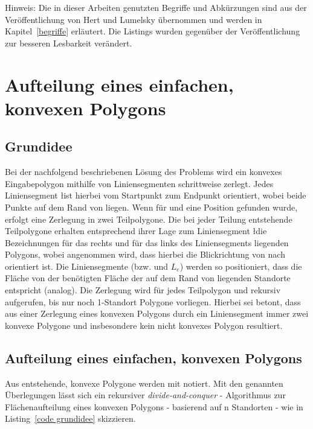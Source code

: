 \documentclass[ngerman]{seminarbeitrag}
\begin{document}
Hinweis: Die in dieser Arbeiten genutzten Begriffe und Abkürzungen sind aus der Veröffentlichung von Hert und Lumelsky \cite{Hert.1998} übernommen und werden in Kapitel~\ref{begriffe} erläutert. Die Listings wurden gegenüber der Veröffentlichung \cite{Hert.1998} zur besseren Lesbarkeit verändert.



\section{Aufteilung eines einfachen, konvexen Polygons}\label{konvex}
\subsection{Grundidee}\label{grundidee konvex}
Bei der nachfolgend beschriebenen Lösung des Problems wird ein konvexes Eingabepolygon \cp mithilfe von Liniensegmenten schrittweise zerlegt. Jedes Liniensegment
\l ist hierbei vom Startpunkt \ls zum Endpunkt \Le orientiert, wobei beide Punkte auf dem Rand von \cp liegen. Wenn für \ls und \Le eine Position gefunden wurde, erfolgt eine Zerlegung in zwei Teilpolygone.
Die bei jeder Teilung entstehende Teilpolygone erhalten entsprechend ihrer Lage zum Liniensegment \l die Bezeichnungen \prl für das rechts und \pll für das links
des Liniensegments liegenden Polygons, wobei angenommen wird, dass hierbei die Blickrichtung von \ls nach \Le orientiert ist. Die Liniensegmente (bzw. \ls und $L_{e}$) werden so positioniert, dass die Fläche von \prl der benötigten Fläche der auf dem Rand von \prl liegenden Standorte entspricht (\pll analog). Die Zerlegung wird für jedes Teilpolygon \prl und \pll rekursiv aufgerufen, bis nur noch 1-Standort Polygone vorliegen. Hierbei sei betont, dass aus einer Zerlegung eines konvexen Polygons durch ein Liniensegment immer zwei konvexe Polygone und insbesondere kein nicht konvexes Polygon resultiert.

\subsection{Aufteilung eines einfachen, konvexen Polygons}\label{aufteilung konvex}
Aus \cp entstehende, konvexe Polygone werden mit \cpi notiert. Mit den genannten Überlegungen lässt sich ein rekursiver \emph{divide-and-conquer} - Algorithmus
zur Flächenaufteilung eines konvexen Polygons - basierend auf n Standorten - wie in Listing~\ref{code grundidee} skizzieren.
\end{document}
